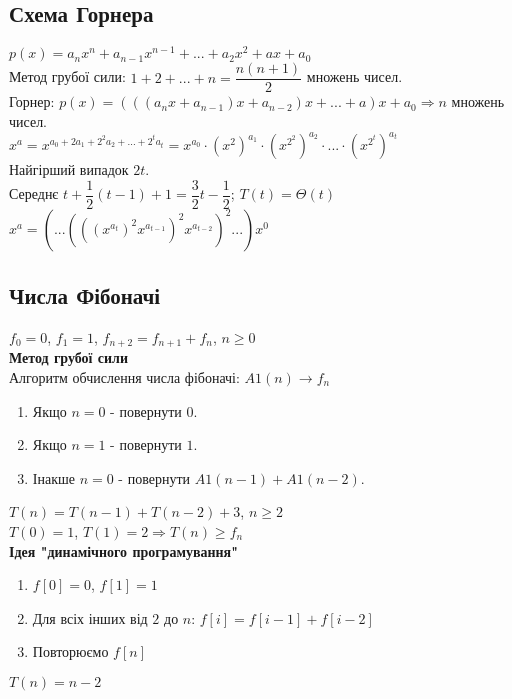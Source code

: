 \documentclass[a4paper,12pt]{article}
\begin{document}
    \subsection{Схема Горнера}
    $p(x)=a_nx^n+a_{n-1}x^{n-1}+...+a_2x^2+ax+a_0$ \\
    Метод грубої сили: $1+2+...+n=\dfrac{n(n+1)}{2}$ множень чисел. \\
    Горнер: $p(x)=(((a_nx+a_{n-1})x+a_{n-2})x+...+a)x+a_0 \Rightarrow n$ множень чисел. \\
    $x^a=x^{a_0+2a_1+2^2a_2+...+2^ta_t}=x^{a_0}\cdot(x^2)^{a_1}\cdot(x^{2^2})^{a_2}\cdot...\cdot(x^{2^t})^{a_t}$ \\
    Найгірший випадок $2t$. \\
    Середнє $t+\dfrac{1}{2}(t-1)+1=\dfrac{3}{2}t-\dfrac{1}{2}$; $T(t)=\Theta(t)$ \\
    $x^a=(...(((x^{a_t})^2x^{a_{t-1}})^2x^{a_{t-2}})^2...)x^0$ 

    \subsection{Числа Фібоначі}
    $f_0=0$, $f_1=1$, $f_{n+2}=f_{n+1}+f_n$, $n\geqslant 0$ \\
    \textbf{Метод грубої сили} \\
    Алгоритм обчислення числа фібоначі: $A1(n)\longrightarrow f_n$
    \begin{enumerate}
        \item Якщо $n=0$ - повернути $0$.
        \item Якщо $n=1$ - повернути $1$.
        \item Інакше $n=0$ - повернути $A1(n-1)+A1(n-2)$.
    \end{enumerate}
    $T(n)=T(n-1)+T(n-2)+3$, $n\geqslant2$ \\
    $T(0)=1$, $T(1)=2\Rightarrow T(n)\geqslant f_n$ \\
    \textbf{Ідея "динамічного програмування"}
    \begin{enumerate}
        \item $f[0]=0$, $f[1]=1$
        \item Для всіх інших від $2$ до $n$: $f[i]=f[i-1]+f[i-2]$
        \item Повторюємо $f[n]$
    \end{enumerate}
    $T(n)=n-2$
\end{document}
